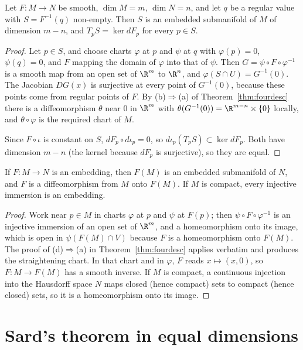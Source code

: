 \begin{theorem}\label{thm:regularvalue}
Let $F\colon M\to N$ be smooth, $\dim M=m$, $\dim N=n$, and let $q$ be a regular value with $S=F^{-1}(q)$ non-empty. Then $S$ is an embedded submanifold of
$M$ of dimension $m-n$, and $T_pS=\ker dF_p$ for every $p\in S$.
\end{theorem}
\begin{proof}
Let $p\in S$, and choose charts $\varphi$ at $p$ and $\psi$ at $q$ with $\varphi(p)=0$, $\psi(q)=0$, and $F$ mapping the domain of $\varphi$ into that of $\psi$.
Then $G=\psi\circ F\circ\varphi^{-1}$ is a smooth map from an open set of $\R^m$ to $\R^n$, and $\varphi(S\cap U)=G^{-1}(0)$. The Jacobian $DG(x)$ is surjective
at every point of $G^{-1}(0)$, because these points come from regular points of $F$. By (b)$\Rightarrow$(a) of Theorem~\ref{thm:fourdesc} there is a diffeomorphism
$\theta$ near $0$ in $\R^m$ with $\theta(G^{-1}(0))=\R^{m-n}\times\{0\}$ locally, and $\theta\circ\varphi$ is the required chart of $M$.

Since $F\circ\iota$ is constant on $S$, $dF_p\circ d\iota_p=0$, so $d\iota_p(T_pS)\subset\ker dF_p$. Both have dimension $m-n$ (the kernel because $dF_p$ is
surjective), so they are equal.
\end{proof}

\begin{proposition}\label{prop:embedding}
If $F\colon M\to N$ is an embedding, then $F(M)$ is an embedded submanifold of $N$, and $F$ is a diffeomorphism from $M$ onto $F(M)$. If $M$ is compact,
every injective immersion is an embedding.
\end{proposition}
\begin{proof}
Work near $p\in M$ in charts $\varphi$ at $p$ and $\psi$ at $F(p)$; then $\psi\circ F\circ\varphi^{-1}$ is an injective immersion of an open set of $\R^m$, and
a homeomorphism onto its image, which is open in $\psi(F(M)\cap V)$ because $F$ is a homeomorphism onto $F(M)$. The proof of (d)$\Rightarrow$(a) in
Theorem~\ref{thm:fourdesc} applies verbatim and produces the straightening chart. In that chart and in $\varphi$, $F$ reads $x\mapsto(x,0)$, so $F\colon M\to F(M)$ has a smooth inverse. If $M$ is compact, a continuous injection into the Hausdorff space $N$ maps closed
(hence compact) sets to compact (hence closed) sets, so it is a homeomorphism onto its image.
\end{proof}

\section{Sard's theorem in equal dimensions}

